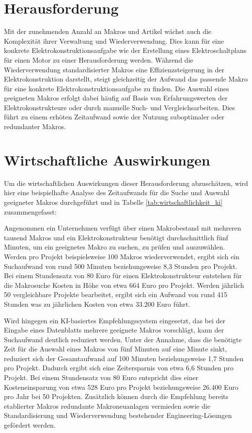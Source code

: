 \section{Herausforderung}
\label{sec:herausforderung}

Mit der zunehmenden Anzahl an Makros und Artikel wächst auch die Komplexität ihrer Verwaltung und Wiederverwendung. 
Dies kann für eine konkrete Elektrokonstruktionsaufgabe wie der Erstellung eines Elektroschaltplans für einen Motor zu einer Herausforderung werden. 
Während die Wiederverwendung standardisierter Makros eine Effizienzsteigerung in der Elektrokonstruktion darstellt, 
steigt gleichzeitig der Aufwand das passende Makro für eine konkrete Elektrokonstruktionsaufgabe zu finden. 
Die Auswahl eines geeigneten Makros erfolgt dabei häufig auf Basis von Erfahrungswerten der Elektrokonstrukteure oder durch manuelle Such- und Vergleichsarbeiten. 
Dies führt zu einem erhöten Zeitaufwand sowie der Nutzung suboptimaler oder redundanter Makros. 

\section{Wirtschaftliche Auswirkungen}
\label{sec:wirtschaftliche_auswirkungen}

Um die wirtschaftlichen Auswirkungen dieser Herausforderung abzuschätzen, wird hier eine beispielhafte Analyse des Zeitaufwands für die Suche und Auswahl geeigneter Makros durchgeführt und in Tabelle \ref{tab:wirtschaftlichkeit_ki} zusammengefasst:

Angenommen ein Unternehmen verfügt über einen Makrobestand mit mehreren tausend Makros und ein Elektrokonstrukteur benötigt durchschnittlich fünf Minuten, um ein geeignetes Makro zu suchen, zu prüfen und auszuwählen. 
Werden pro Projekt beispielsweise 100 Makros wiederverwendet, ergibt sich ein Suchaufwand von rund 500 Minuten beziehungsweise 8,3 Stunden pro Projekt. 
Bei einem Stundensatz von 80 Euro für einen Elektrokonstrukteur entstehen für die Makrosuche Kosten in Höhe von etwa 664 Euro pro Projekt. 
Werden jährlich 50 vergleichbare Projekte bearbeitet, ergibt sich ein Aufwand von rund 415 Stunden was zu jährlichen Kosten von etwa 33.200 Euro führt. 
    
Wird hingegen ein KI-basiertes Empfehlungssystem eingesetzt, das bei der Eingabe eines Datenblatts mehrere geeignete Makros vorschlägt, kann der Suchaufwand deutlich reduziert werden. 
Unter der Annahme, dass die benötigte Zeit für die Auswahl eines Makros von fünf Minuten auf eine Minute sinkt, reduziert sich der Gesamtaufwand auf 100 Minuten beziehungsweise 1,7 Stunden pro Projekt. 
Dadurch ergibt sich eine Zeitersparnis von etwa 6,6 Stunden pro Projekt. 
Bei einem Stundensatz von 80 Euro entspricht dies einer Kosteneinsparung von etwa 528 Euro pro Projekt beziehungsweise 26.400 Euro pro Jahr bei 50 Projekten. 
Zusätzlich können durch die Empfehlung bereits etablierter Makros redundante Makroneuanlagen vermieden sowie die Standardisierung und Wiederverwendung bestehender Engineering-Lösungen gefördert werden.

